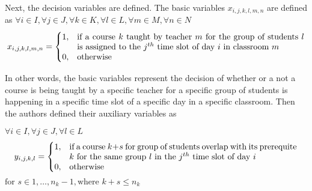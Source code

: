Next, the decision variables are defined. The basic variables
\begin{math}
	x_{i,j,k,l,m,n}
\end{math}
are defined as
\begin{math}
	\forall i \in I, \forall j \in J, \forall k \in K, \forall l \in L, \forall
	m \in M, \forall n \in N
\end{math}
\begin{align*}
	x_{i,j,k,l,m,n} = 
	\begin{cases}
		1, & \parbox[t]{9.5cm}{if a course \( k \) taught by teacher \( m \) for
		the group of students \( l \) is assigned to the \( j^{th} \) time slot 
		of day \( i \) in classroom \( m \)} \\
		0, & \text{otherwise}
	\end{cases}
\end{align*}

In other words, the basic variables represent the decision of whether or a not
a course is being taught by a specific teacher for a specific group of students
is happening in a specific time slot of a specific day in a specific classroom.
Then the authors defined their auxiliary variables as

\begin{math}
	\forall i \in I, \forall j \in J, \forall l \in L
\end{math}
\begin{align*}
	y_{i,j,k,l} = 
	\begin{cases}
		1, & \parbox[t]{9.5cm}{if a course \( k + s \) for group of students
		overlap with its prerequite \( k \) for the same group \( l \) in the 
		\( j^{th} \) time slot of day \( i \)} \\
		0, & \text{otherwise}
	\end{cases}	
\end{align*}
\begin{math}
	\text{for } s \in 1, \ldots, n_k - 1, \text{where } k + s \leq n_k	
\end{math}

